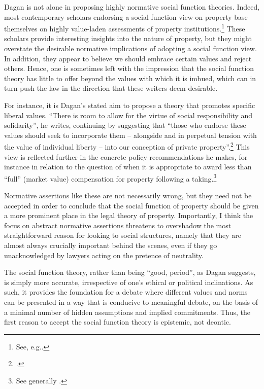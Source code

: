 Dagan is not alone in proposing highly normative social function theories. Indeed, most contemporary scholars endorsing a social function view on property base themselves on highly value-laden assessments of property institutions.\footnote{See, e.g.\cite{alexander09,crawford11,davidson11,singer09,penalver09}.} These scholars provide interesting insights into the nature of property, but they might overstate the desirable normative implications of adopting a social function view. In addition, they appear to believe we should embrace certain values and reject others. Hence, one is sometimes left with the impression that the social function theory has little to offer beyond the values with which it is imbued, which can in turn push the law in the direction that these writers deem desirable. 

For instance, it is Dagan's stated aim to propose a theory that promotes specific liberal values. ``There is room to allow for the virtue of social responsibility and solidarity'', he writes, continuing by suggesting that ``those who endorse these values should seek to incorporate them -- alongside and in perpetual tension with the value of individual liberty -- into our conception of private property''.\footcite[802]{dagan99} This view is reflected further in the concrete policy recommendations he makes, for instance in relation to the question of when it is appropriate to award less than ``full'' (market value) compensation for property following a taking.\footnote{See generally \cite{dagan14b}.}

Normative assertions like these are not necessarily wrong, but they need not be accepted in order to conclude that the social function of property should be given a more prominent place in the legal theory of property. Importantly, I think the focus on abstract normative assertions threatens to overshadow the most straightforward reason for looking to social structures, namely that they are almost always crucially important behind the scenes, even if they go unacknowledged by lawyers acting on the pretence of neutrality.

The social function theory, rather than being ``good, period'', as Dagan suggests, is simply more  accurate, irrespective of one's ethical or political inclinations. As such, it provides the foundation for a debate where different values and norms can be presented in a way that is conducive to meaningful debate, on the basis of a minimal number of hidden assumptions and implied commitments. Thus, the first reason to accept the social function theory is epistemic, not deontic.

